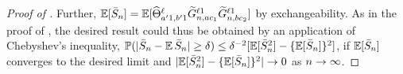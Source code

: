 \begin{proof}[Proof of ]
    Further, 
    $
        \operatorname*{\mathbb{E}} [\bar{S}_{n}]
        =
        \operatorname*{\mathbb{E}} [
            \widehat{\Theta}_{
                a' 1 , b' 1
            }^{\ell}
            \widetilde{G}_{n, a c_1}^{\ell 1}
            \widetilde{G}_{n, b c_2}^{\ell 1}
        ]
    $
    by exchangeability.
    As in the proof of , the desired result could thus be obtained by an application of Chebyshev's inequality, $\operatorname{\mathbb{P}}(|\bar{S}_{n} - \operatorname*{\mathbb{E}} \bar{S}_{n}| \geq \delta) \leq \delta^{-2} [ \operatorname*{\mathbb{E}} [\bar{S}_{n}^2] - \{ \operatorname*{\mathbb{E}} [ \bar{S}_{n} ] \}^2 ] $, if $\operatorname*{\mathbb{E}} [ \bar{S}_{n} ]$ converges to the desired limit and $|\! \operatorname*{\mathbb{E}} [\bar{S}_{n}^2] - \{ \operatorname*{\mathbb{E}} [ \bar{S}_{n} ] \}^2| \to 0$ as $n \to \infty$.
    

\end{proof}
